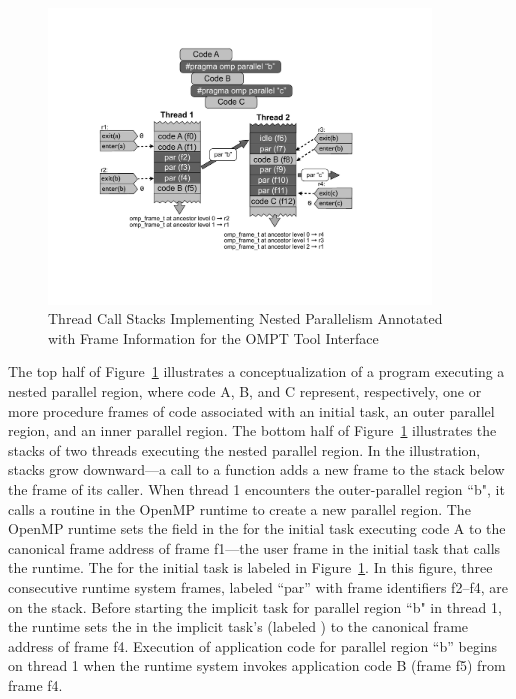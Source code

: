    \begin{figure}[h]
    \centering
        \includegraphics[width=4in]{appendices/callstack-cropped.pdf}
    \caption{Thread Call Stacks Implementing Nested Parallelism
      Annotated with Frame Information for the OMPT Tool Interface\label{fig:frame}}
\end{figure}

The top half of Figure~\ref{fig:frame} illustrates a
conceptualization of a program executing a nested
parallel region, where code A, B, and C represent, respectively, one
or more procedure frames of code
associated with an initial task, an outer parallel region, and an inner parallel
region. The bottom half of Figure~\ref{fig:frame} illustrates the stacks of two
threads executing the nested parallel region.
In the illustration, stacks grow downward---a call to a function adds
a new frame to the stack below the frame of its caller.
When thread 1 encounters the outer-parallel
region ``b", it calls a routine in the OpenMP runtime to
create a new parallel region. The OpenMP runtime sets the
 field in the  for the initial
task executing code A to the canonical frame address of frame f1---the user frame in the initial task
that calls the runtime. The  for the initial task
is labeled  in Figure~\ref{fig:frame}. In this figure, three
consecutive runtime system frames, labeled ``par'' with frame
identifiers f2--f4, are on the stack.  Before starting the implicit
task for parallel region ``b" in thread 1, the runtime sets the
 in the implicit task's  (labeled
) to the canonical frame address of frame f4. Execution of application code for parallel region
``b'' begins on thread 1 when the runtime system invokes application
code B (frame f5) from frame f4.

